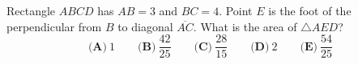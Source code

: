Rectangle $ABCD$ has $AB=3$ and $BC=4$. Point $E$ is the foot of the perpendicular from $B$ to diagonal $\overline{AC}$. What is the area of $\triangle AED$?
\[\textbf{(A)}\ 1\qquad\textbf{(B)}\ \dfrac{42}{25}\qquad\textbf{(C)}\ \dfrac{28}{15}\qquad\textbf{(D)}\ 2\qquad\textbf{(E)}\ \dfrac{54}{25}\]
